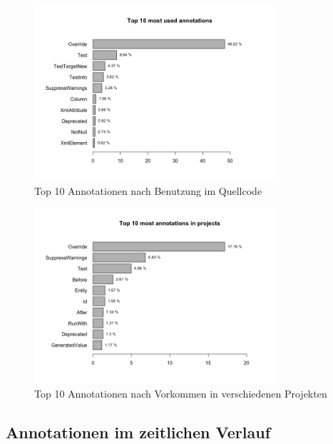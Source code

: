 \documentclass[11pt,a4paper,parskip=full]{scrartcl}
\begin{document}
\begin{figure}[H]
	\centering
	\includegraphics[width=0.8\textwidth]{plots/top10_use.png}
	\caption{Top 10 Annotationen nach Benutzung im Quellcode}
	\label{top10_use}
\end{figure}
\begin{figure}[H]
	\centering
	\includegraphics[width=0.8\textwidth]{plots/top10_projects.png}
	\caption{Top 10 Annotationen nach Vorkommen in verschiedenen Projekten}
	\label{top10_projects}
\end{figure}

\subsection{Annotationen im zeitlichen Verlauf}
\end{document}
